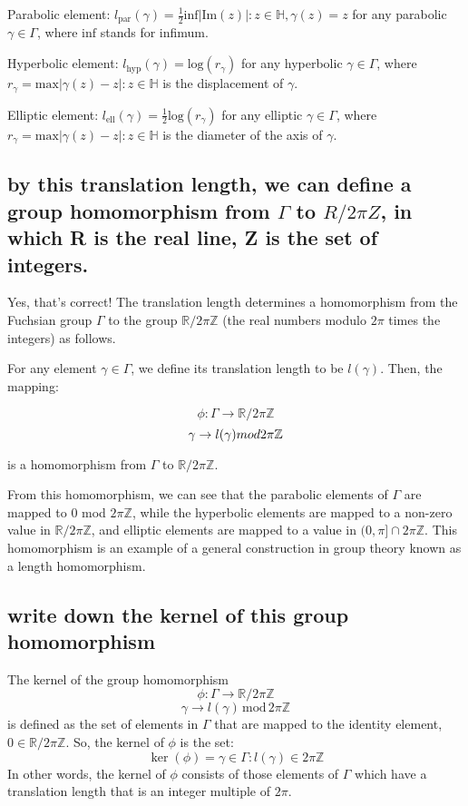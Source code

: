 \documentclass[12pt,a4paper,english]{article}
\theoremstyle{plain}
\theoremstyle{definition}
\theoremstyle{remark}
\begin{document}
Parabolic element: $l_\mathrm{par}(\gamma)=\frac{1}{2}\mathrm{inf}{\left|\mathrm{Im}(z)\right|:z\in\mathbb{H},\gamma(z)=z}$ for any parabolic $\gamma\in\Gamma$, where $\mathrm{inf}$ stands for infimum.

Hyperbolic element: $l_\mathrm{hyp}(\gamma)=\mathrm{log}(r_\gamma)$ for any hyperbolic $\gamma\in\Gamma$, where $r_\gamma=\mathrm{max}{\left|\gamma(z)-z\right|:z\in\mathbb{H}}$ is the displacement of $\gamma$.

Elliptic element: $l_\mathrm{ell}(\gamma)=\frac{1}{2}\mathrm{log}(r_\gamma)$ for any elliptic $\gamma\in\Gamma$, where $r_\gamma=\mathrm{max}{\left|\gamma(z)-z\right|:z\in\mathbb{H}}$ is the diameter of the axis of $\gamma$.

\subsection{by this translation length, we can define a group homomorphism from $\Gamma$ to $R/2\pi Z$, in which R is the real line, Z is the set of integers.}
Yes, that's correct! The translation length determines a homomorphism from the Fuchsian group $\Gamma$ to the group $\mathbb{R}/2\pi\mathbb{Z}$ (the real numbers modulo $2\pi$ times the integers) as follows.

For any element $\gamma \in \Gamma$, we define its translation length to be $l(\gamma)$. Then, the mapping:

$$\phi : \Gamma \rightarrow \mathbb{R}/2\pi\mathbb{Z}$$ $$\gamma \rightarrow l(\gamma) \space mod \space 2\pi \mathbb{Z}$$

is a homomorphism from $\Gamma$ to $\mathbb{R}/2\pi\mathbb{Z}$.

From this homomorphism, we can see that the parabolic elements of $\Gamma$ are mapped to $0$ mod $2\pi\mathbb{Z}$, while the hyperbolic elements are mapped to a non-zero value in $\mathbb{R}/2\pi\mathbb{Z}$, and elliptic elements are mapped to a value in $(0,\pi]\cap 2\pi\mathbb{Z}$. This homomorphism is an example of a general construction in group theory known as a length homomorphism.

\subsection{write down the kernel of this group homomorphism}
The kernel of the group homomorphism $$\phi : \Gamma \rightarrow \mathbb{R}/2\pi\mathbb{Z}$$ $$\gamma \rightarrow l(\gamma) \, \mathrm{mod} \, 2\pi\mathbb{Z}$$ is defined as the set of elements in $\Gamma$ that are mapped to the identity element, $0\in\mathbb{R}/2\pi\mathbb{Z}$. So, the kernel of $\phi$ is the set: $$\ker(\phi)={\gamma\in\Gamma:l(\gamma)\in2\pi\mathbb{Z}}$$ In other words, the kernel of $\phi$ consists of those elements of $\Gamma$ which have a translation length that is an integer multiple of $2\pi$.
\end{document}
